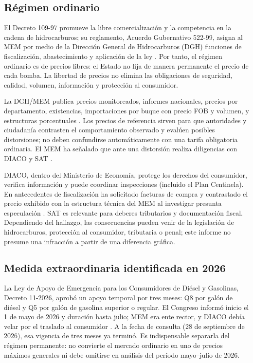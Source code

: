 \documentclass[11pt,letterpaper]{article}
\begin{document}
\subsection{Régimen ordinario}
El Decreto 109-97 promueve la libre comercialización y la competencia en la cadena de hidrocarburos; su reglamento, Acuerdo Gubernativo 522-99, asigna al MEM por medio de la Dirección General de Hidrocarburos (DGH) funciones de fiscalización, abastecimiento y aplicación de la ley \parencite{congresoComercializacion1997,memReglamento5221999}. Por tanto, el régimen ordinario es de precios libres: el Estado no fija de manera permanente el precio de cada bomba. La libertad de precios no elimina las obligaciones de seguridad, calidad, volumen, información y protección al consumidor.

La DGH/MEM publica precios monitoreados, informes nacionales, precios por departamento, existencias, importaciones por buque con precio FOB y volumen, y estructuras porcentuales \parencite{memPrecios2026}. Los precios de referencia sirven para que autoridades y ciudadanía contrasten el comportamiento observado y evalúen posibles distorsiones; no deben confundirse automáticamente con una tarifa obligatoria ordinaria. El MEM ha señalado que ante una distorsión realiza diligencias con DIACO y SAT \parencite{memSeguimiento2026}.

DIACO, dentro del Ministerio de Economía, protege los derechos del consumidor, verifica información y puede coordinar inspecciones (incluido el Plan Centinela). En antecedentes de fiscalización ha solicitado facturas de compra y contrastado el precio exhibido con la estructura técnica del MEM al investigar presunta especulación \parencite{diacoEspeculacion2020,diacoCentinela2017}. SAT es relevante para deberes tributarios y documentación fiscal. Dependiendo del hallazgo, las consecuencias pueden venir de la legislación de hidrocarburos, protección al consumidor, tributaria o penal; este informe no presume una infracción a partir de una diferencia gráfica.

\subsection{Medida extraordinaria identificada en 2026}
La Ley de Apoyo de Emergencia para los Consumidores de Diésel y Gasolinas, Decreto 11-2026, aprobó un apoyo temporal por tres meses: Q8 por galón de diésel y Q5 por galón de gasolina superior o regular. El Congreso informó inicio el 1 de mayo de 2026 y duración hasta julio; MEM era ente rector, y DIACO debía velar por el traslado al consumidor \parencite{congresoApoyo2026,congresoSubsidio2026}. A la fecha de consulta (28 de septiembre de 2026), esa vigencia de tres meses ya terminó. Es indispensable separarla del régimen permanente: no convierte el mercado ordinario en uno de precios máximos generales ni debe omitirse en análisis del período mayo--julio de 2026.
\end{document}
